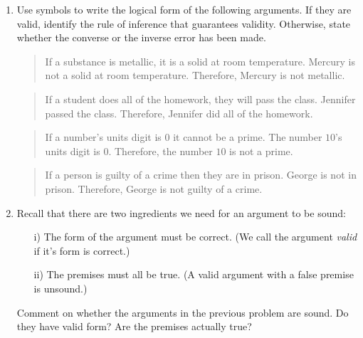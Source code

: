 \documentclass{amsart}
\begin{document}
\begin{enumerate}
\newpage

\item Use symbols to write the logical form of the following arguments.
  If they are valid, identify the rule of inference that guarantees
  validity.  Otherwise, state whether the converse or the inverse error
  has been made. 

\begin{quote}
 If a substance is metallic, it is a solid at room temperature. \newline
 Mercury is not a solid at room temperature. \newline
 Therefore, Mercury is not metallic.
\end{quote}

\vfill


\begin{quote}
 If a student does all of the homework, they will pass the class.\newline
 Jennifer passed the class.\newline
 Therefore, Jennifer did all of the homework.
\end{quote}

\vfill

\begin{quote}
  If a number's units digit is $0$ it cannot be a prime.\newline
  The number $10$'s units digit is $0$. \newline
  Therefore, the number $10$ is not a prime. \newline
\end{quote}

\vfill

\begin{quote}
  If a person is guilty of a crime then they are in prison. \newline 
  George is not in prison. \newline 
  Therefore, George is not guilty of a crime. 
\end{quote}

\vfill


\newpage

\item Recall that there are two ingredients we need for an argument to be sound:
\begin{enumerate}
\item[i)] The form of the argument must be correct. (We call the argument {\em valid} if it's form is correct.)
\item[ii)] The premises must all be true.  (A valid argument with a false premise is unsound.) 
\end{enumerate}

Comment on whether the arguments in the previous problem are sound.  Do they have valid form?  Are the premises actually true?

\end{enumerate}
\end{document}
